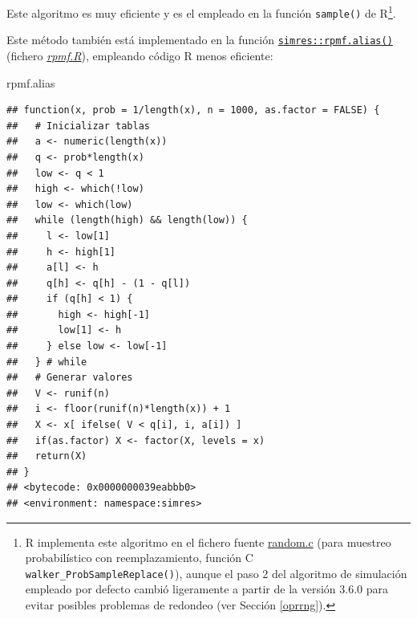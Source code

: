 \documentclass[
]{book}
\newenvironment{Shaded}{\begin{snugshade}}{\end{snugshade}}
\newcommand{\NormalTok}[1]{#1}
\theoremstyle{break}
\theoremstyle{nonumberplain}
\begin{document}
Este algoritmo es muy eficiente y es el empleado en la función \texttt{sample()} de R\footnote{R implementa este algoritmo en el fichero fuente \href{https://svn.r-project.org/R/trunk/src/main/random.c}{random.c} (para muestreo probabilístico con reemplazamiento, función C \texttt{walker\_ProbSampleReplace()}), aunque el paso 2 del algoritmo de simulación empleado por defecto cambió ligeramente a partir de la versión 3.6.0 para evitar posibles problemas de redondeo (ver Sección \ref{oprrng}).}.

Este método también está implementado en la función \href{https://rubenfcasal.github.io/simres/reference/rpmf.alias.html}{\texttt{simres::rpmf.alias()}} (fichero \href{R/rpmf.R}{\emph{rpmf.R}}), empleando código R menos eficiente:

\begin{Shaded}
\begin{Highlighting}[]
\NormalTok{rpmf.alias}
\end{Highlighting}
\end{Shaded}

\begin{verbatim}
## function(x, prob = 1/length(x), n = 1000, as.factor = FALSE) {
##   # Inicializar tablas
##   a <- numeric(length(x))
##   q <- prob*length(x)
##   low <- q < 1
##   high <- which(!low)
##   low <- which(low)
##   while (length(high) && length(low)) {
##     l <- low[1]
##     h <- high[1]
##     a[l] <- h
##     q[h] <- q[h] - (1 - q[l])
##     if (q[h] < 1) {
##       high <- high[-1]
##       low[1] <- h
##     } else low <- low[-1]
##   } # while
##   # Generar valores
##   V <- runif(n)
##   i <- floor(runif(n)*length(x)) + 1
##   X <- x[ ifelse( V < q[i], i, a[i]) ]
##   if(as.factor) X <- factor(X, levels = x)
##   return(X)
## }
## <bytecode: 0x0000000039eabbb0>
## <environment: namespace:simres>
\end{verbatim}
\end{document}
